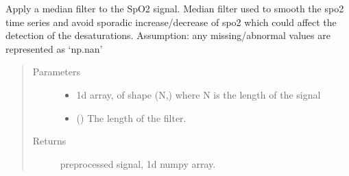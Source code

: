 \documentclass[letterpaper,10pt,english]{sphinxmanual}
\begin{document}
\begin{fulllineitems}
\label{\detokenize{pobm:pobm.prep.median_spo2}}
Apply a median filter to the SpO2 signal.
Median filter used to smooth the spo2 time series and avoid sporadic increase/decrease of spo2 which could 
affect the detection of the desaturations.
Assumption: any missing/abnormal values are represented as ‘np.nan’
\begin{quote}\begin{description}
\item[{Parameters}] \leavevmode\begin{itemize}
\item {} 
 \textendash{} 1\sphinxhyphen{}d array, of shape (N,) where N is the length of the signal

\item {} 
\sphinxstyleliteralstrong{\sphinxupquote{(}}\sphinxstyleliteralstrong{\sphinxupquote{)}} () \textendash{} The length of the filter.

\end{itemize}

\item[{Returns}] \leavevmode
preprocessed signal, 1\sphinxhyphen{}d numpy array.

\end{description}\end{quote}

\end{fulllineitems}

\end{document}
